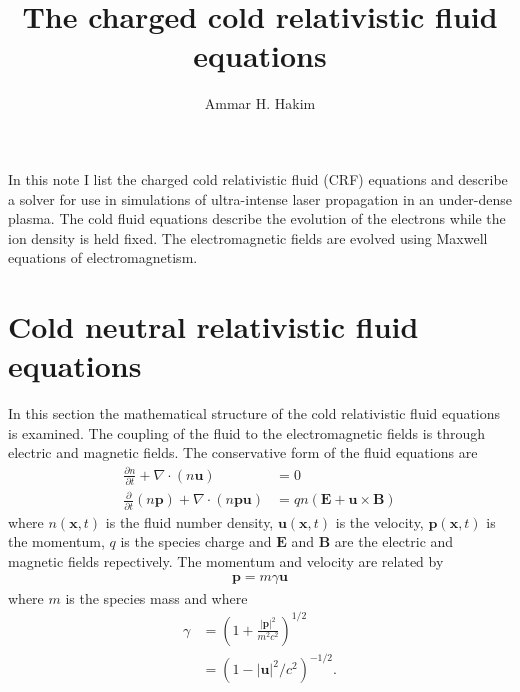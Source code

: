 \documentclass[11pt, reqno]{amsart}
\title{The charged cold relativistic fluid equations}%
\author{Ammar H. Hakim}%
\date{}
\newcommand{\pfrac}[2]{\frac{\partial #1}{\partial #2}}
\newcommand{\pfraca}[1]{\frac{\partial}{\partial #1}}
\newcommand{\mvec}[1]{\mathbf{#1}}
\theoremstyle{definition}
\begin{document}

\maketitle

In this note I list the charged cold relativistic fluid (CRF)
equations and describe a solver for use in simulations of
ultra-intense laser propagation in an under-dense plasma. The cold
fluid equations describe the evolution of the electrons while the ion
density is held fixed. The electromagnetic fields are evolved using
Maxwell equations of electromagnetism.

\section{Cold neutral relativistic fluid equations}

In this section the mathematical structure of the cold relativistic
fluid equations is examined. The coupling of the fluid to the
electromagnetic fields is through electric and magnetic fields. The
conservative form of the fluid equations are
\begin{align}
  \pfrac{n}{t} + \nabla\cdot(n\mvec{u}) &= 0 \\
  \pfraca{t}(n\mvec{p}) + \nabla\cdot (n\mvec{p}\mvec{u}) &= 
  qn\left(\mvec{E} + \mvec{u}\times\mvec{B}\right)
\end{align}
where $n(\mvec{x},t)$ is the fluid number density,
$\mvec{u}(\mvec{x},t)$ is the velocity, $\mvec{p}(\mvec{x},t)$ is the
momentum, $q$ is the species charge and $\mvec{E}$ and $\mvec{B}$ are
the electric and magnetic fields repectively. The momentum and
velocity are related by
\begin{align}
  \mvec{p} = m\gamma \mvec{u}
\end{align}
where $m$ is the species mass and where
\begin{align}
  \gamma &= \left(1+\frac{|\mvec{p}|^2}{m^2c^2}\right)^{1/2} \\
  &= \left(1-|\mvec{u}|^2/c^2\right)^{-1/2}.
\end{align}
\end{document}
